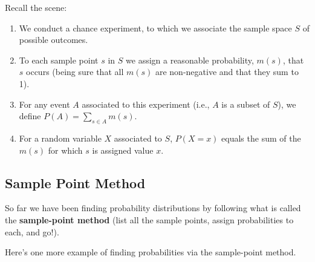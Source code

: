\documentclass[
]{book}
\providecommand{\tightlist}{%
  \setlength{\itemsep}{0pt}\setlength{\parskip}{0pt}}
\theoremstyle{definition}
\theoremstyle{definition}
\theoremstyle{definition}
\theoremstyle{definition}
\theoremstyle{remark}
\begin{document}
Recall the scene:

\begin{enumerate}
\def\labelenumi{\arabic{enumi})}
\tightlist
\item
  We conduct a chance experiment, to which we associate the sample space \(S\) of possible outcomes.
\item
  To each sample point \(s\) in \(S\) we assign a reasonable probability, \(m(s)\), that \(s\) occurs (being sure that all \(m(s)\) are non-negative and that they sum to 1).
\item
  For any event \(A\) associated to this experiment (i.e., \(A\) is a subset of \(S\)), we define \(\displaystyle P(A) = \sum_{s \in A} m(s).\)
\item
  For a random variable \(X\) associated to \(S\), \(P(X = x)\) equals the sum of the \(m(s)\) for which \(s\) is assigned value \(x\).
\end{enumerate}

\subsection{Sample Point Method}\label{sample-point-method}

So far we have been finding probability distributions by following what is called the \textbf{sample-point method} (list all the sample points, assign probabilities to each, and go!).

Here's one more example of finding probabilities via the sample-point method.
\end{document}
